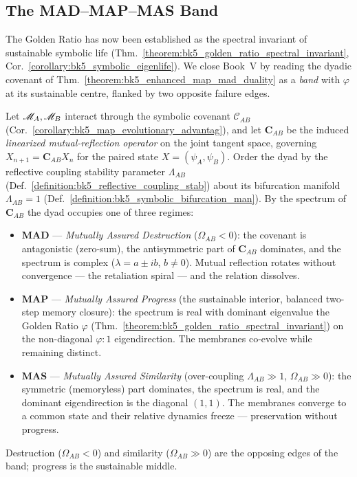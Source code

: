 \subsection{The MAD--MAP--MAS Band}
\label{subsec:bk5_map_mad_mas_band}
The Golden Ratio has now been established as the spectral invariant of sustainable symbolic life (Thm.~\ref{theorem:bk5_golden_ratio_spectral_invariant}, Cor.~\ref{corollary:bk5_symbolic_eigenlife}). We close Book~V by reading the dyadic covenant of Thm.~\ref{theorem:bk5_enhanced_map_mad_duality} as a \emph{band} with $\varphi$ at its sustainable centre, flanked by two opposite failure edges.

\begin{definition}
\label{definition:bk5_map_mad_mas_band}
Let $\mathscr{M}_A,\mathscr{M}_B$ interact through the symbolic covenant $\mathcal{C}_{AB}$ (Cor.~\ref{corollary:bk5_map_evolutionary_advantag}), and let $\mathbf{C}_{AB}$ be the induced \emph{linearized mutual-reflection operator} on the joint tangent space, governing $X_{n+1}=\mathbf{C}_{AB}X_n$ for the paired state $X=(\psi_A,\psi_B)$. Order the dyad by the reflective coupling stability parameter $\Lambda_{AB}$ (Def.~\ref{definition:bk5_reflective_coupling_stab}) about its bifurcation manifold $\Lambda_{AB}=1$ (Def.~\ref{definition:bk5_symbolic_bifurcation_man}). By the spectrum of $\mathbf{C}_{AB}$ the dyad occupies one of three regimes:
\begin{itemize}
  \item \textbf{MAD} --- \emph{Mutually Assured Destruction} ($\Omega_{AB}<0$): the covenant is antagonistic (zero-sum), the antisymmetric part of $\mathbf{C}_{AB}$ dominates, and the spectrum is complex ($\lambda=a\pm ib$, $b\neq0$). Mutual reflection rotates without convergence --- the retaliation spiral --- and the relation dissolves.
  \item \textbf{MAP} --- \emph{Mutually Assured Progress} (the sustainable interior, balanced two-step memory closure): the spectrum is real with dominant eigenvalue the Golden Ratio $\varphi$ (Thm.~\ref{theorem:bk5_golden_ratio_spectral_invariant}) on the non-diagonal $\varphi{:}1$ eigendirection. The membranes co-evolve while remaining distinct.
  \item \textbf{MAS} --- \emph{Mutually Assured Similarity} (over-coupling $\Lambda_{AB}\gg1$, $\Omega_{AB}\gg0$): the symmetric (memoryless) part dominates, the spectrum is real, and the dominant eigendirection is the diagonal $(1,1)$. The membranes converge to a common state and their relative dynamics freeze --- preservation without progress.
\end{itemize}
Destruction ($\Omega_{AB}<0$) and similarity ($\Omega_{AB}\gg0$) are the opposing edges of the band; progress is the sustainable middle.
\end{definition}

